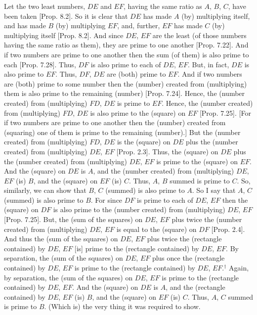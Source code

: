 \begin{Parallel}{}{}
{Let the two least numbers, $DE$ and $EF$, having the same ratio as
$A$, $B$, $C$, have been taken [Prop. 8.2]. So
it is clear that $DE$ has made $A$ (by) multiplying itself, and
has made $B$ (by) multiplying $EF$, and, further, $EF$ has made $C$ (by)
multiplying itself [Prop. 8.2]. And since $DE$, $EF$ are the least (of those numbers having the same ratio as them), 
they are prime to one another [Prop. 7.22]. 
And if two numbers are prime to one another then the sum (of them)
is also prime to each [Prop. 7.28]. Thus, $DF$
is also prime to each of $DE$, $EF$. But, in fact, $DE$ is  also prime to $EF$.
Thus, $DF$, $DE$ are (both) prime to $EF$. And if two numbers are (both)
prime to some number then the (number) created from (multiplying) them
is also prime to the remaining (number) [Prop. 7.24].
Hence, the (number created) from (multiplying) $FD$, $DE$ is prime
to $EF$. Hence, the (number created) from (multiplying) $FD$, $DE$ is also prime
to the (square) on $EF$ [Prop. 7.25]. 
[For if two numbers are prime to one another then the (number) created from
(squaring) one of them is prime to the remaining (number).]
But the (number created) from (multiplying) $FD$, $DE$ is the
(square) on $DE$ plus the (number created) from (multiplying) $DE$, $EF$
[Prop. 2.3]. Thus, the (square) on $DE$ plus
the (number created) from (multiplying) $DE$, $EF$ is prime to the
(square) on $EF$. 
And the (square)
on $DE$ is $A$, and the (number created) from (multiplying) $DE$, $EF$
(is) $B$, and the (square) on $EF$ (is) $C$. Thus,  $A$, $B$ summed is prime to $C$. So,  similarly, we can show that $B$, $C$ (summed) is also
prime to $A$. So I say that $A$, $C$ (summed) is also prime to $B$.
For since $DF$ is prime to each of $DE$, $EF$ then the (square) on
$DF$ is also prime to the (number created) from (multiplying) $DE$, $EF$
[Prop. 7.25]. But, the (sum of the squares) on $DE$, $EF$
plus twice the (number created) from (multiplying) $DE$, $EF$ is equal to
the (square) on $DF$ [Prop. 2.4]. And thus
the (sum of the squares) on $DE$, $EF$ plus twice  the (rectangle contained) by $DE$, $EF$ [is] prime to the (rectangle contained) by $DE$, $EF$.
By separation, the (sum of the squares) on $DE$, $EF$ plus  once the (rectangle contained) by $DE$, $EF$  is prime to the (rectangle contained)  by $DE$, $EF$.$^\dag$ Again, by separation,  the (sum of the squares) on $DE$, $EF$ is prime to the (rectangle contained)  by $DE$, $EF$. And the (square) on $DE$   is $A$,  and the (rectangle contained) by $DE$, $EF$ (is) $B$, and the (square) on $EF$ (is) $C$. Thus, $A$, $C$
summed is prime to $B$. (Which is) the very thing it was required to show.}
\end{Parallel}


